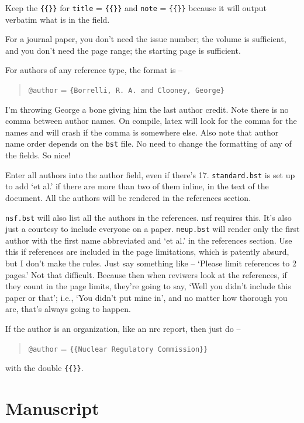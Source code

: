 \documentclass[11pt,a4paper]{article}
\newcommand{\acs}{\acrshort} %
\begin{document}
Keep the \verb={{}}= for \verb=title= = \verb={{}}= and \verb=note= = \verb={{}}= because it will output verbatim what is in the field. 

For a journal paper, you don't need the issue number; the volume is sufficient, and you don't need the page range; the starting page is sufficient. 

For authors of any reference type, the format is --
\begin{quote}
    \verb=@author= = \verb={Borrelli, R. A. and Clooney, George}=
\end{quote}

I'm throwing George a bone giving him the last author credit. Note there is no comma between author names. On compile, latex will look for the comma for the names and will crash if the comma is somewhere else. Also note that author name order depends on the \verb=bst= file. No need to change the formatting of any of the fields. So nice!

Enter all authors into the author field, even if there's 17. \verb=standard.bst= is set up to add `et al.' if there are more than two of them inline, in the text of the document. All the authors will be rendered in the references section. 

\verb=nsf.bst= will also list all the authors in the references. \acs{nsf} requires this. It's also just a courtesy to include everyone on a paper. \verb=neup.bst= will render only the first author with the first name abbreviated and `et al.' in the references section. Use this if references are included in the page limitations, which is patently absurd, but I don't make the rules. Just say something like -- `Please limit references to 2 pages.' Not that difficult. Because then when reviwers look at the references, if they count in the page limits, they're going to say, `Well you didn't include this paper or that'; i.e., `You didn't put mine in', and no matter how thorough you are, that's always going to happen. 

If the author is an organization, like an \acs{nrc} report, then just do -- 
\begin{quote}
    \verb=@author= = \verb={{Nuclear Regulatory Commission}}= 
\end{quote}
with the double \verb={{}}=.


\newpage


\section{Manuscript}
\end{document}
